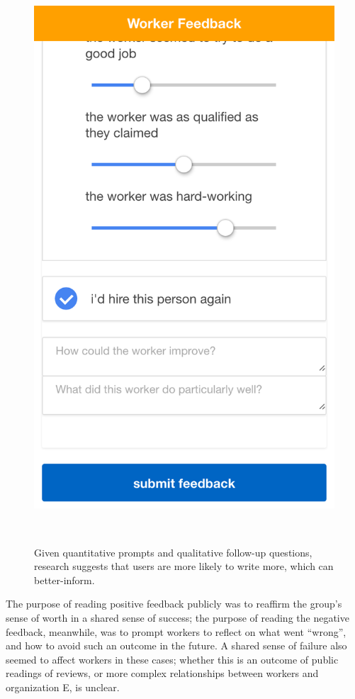 \begin{figure}[t]
\centering
  \includegraphics[width=1\columnwidth]{figures/feedback}
    \caption{Given quantitative prompts and qualitative follow-up questions,
  research suggests that users are more likely to write more,
  which can better-inform.}~\label{fig:workerFeedback}
\end{figure}

The purpose of reading positive feedback publicly was to reaffirm the group's sense of worth in a shared sense of success;
the purpose of reading the negative feedback, meanwhile, was to prompt workers to reflect on what went ``wrong'', and how to avoid such an outcome in the future.
A shared sense of failure also seemed to affect workers in these cases;
whether this is an outcome of public readings of reviews, or more complex relationships between workers and organization E, is unclear.

